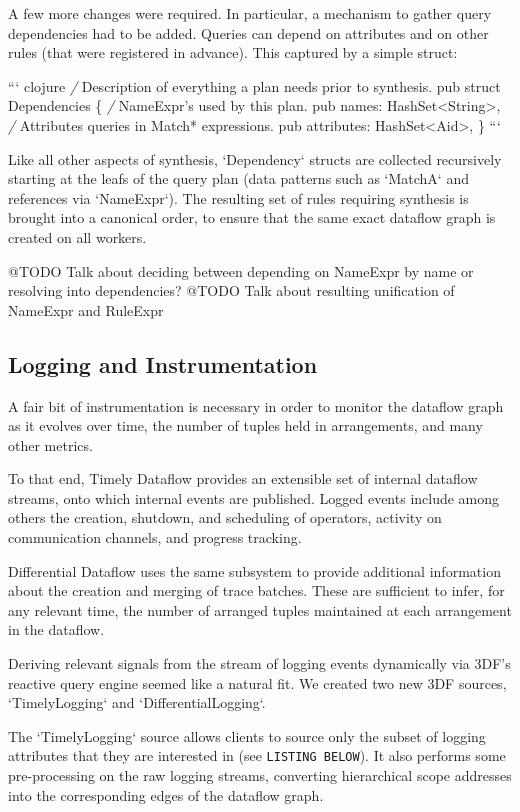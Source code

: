 \documentclass[../index.tex]{subfiles}
\begin{document}
A few more changes were required. In particular, a mechanism to gather
query dependencies had to be added. Queries can depend on attributes
and on other rules (that were registered in advance). This captured by
a simple struct:

``` clojure
\emph{/} Description of everything a plan needs prior to synthesis.
pub struct Dependencies \{
    \emph{/} NameExpr's used by this plan.
    pub names: HashSet<String>,
    \emph{/} Attributes queries in Match* expressions.
    pub attributes: HashSet<Aid>,
\}
```

Like all other aspects of synthesis, `Dependency` structs are
collected recursively starting at the leafs of the query plan (data
patterns such as `MatchA` and references via `NameExpr`). The
resulting set of rules requiring synthesis is brought into a canonical
order, to ensure that the same exact dataflow graph is created on all
workers.

@TODO Talk about deciding between depending on NameExpr by name or resolving into dependencies?
@TODO Talk about resulting unification of NameExpr and RuleExpr

\subsection{Logging and Instrumentation} \label{logging}

A fair bit of instrumentation is necessary in order to monitor the
dataflow graph as it evolves over time, the number of tuples held in
arrangements, and many other metrics.

To that end, Timely Dataflow provides an extensible set of internal
dataflow streams, onto which internal events are published. Logged
events include among others the creation, shutdown, and scheduling of
operators, activity on communication channels, and progress tracking.

Differential Dataflow uses the same subsystem to provide additional
information about the creation and merging of trace batches. These are
sufficient to infer, for any relevant time, the number of arranged
tuples maintained at each arrangement in the dataflow.

Deriving relevant signals from the stream of logging events
dynamically via 3DF's reactive query engine seemed like a natural
fit. We created two new 3DF sources, `TimelyLogging` and
`DifferentialLogging`.

The `TimelyLogging` source allows clients to source only the subset of
logging attributes that they are interested in (see \texttt{LISTING
BELOW}). It also performs some pre-processing on the raw logging
streams, converting hierarchical scope addresses into the
corresponding edges of the dataflow graph.
\end{document}
